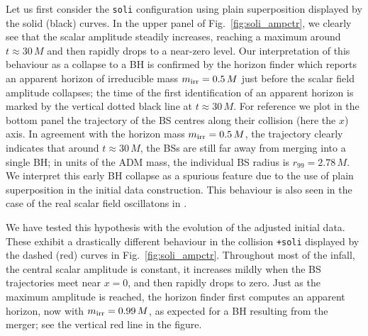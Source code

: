 \documentclass[]{iopart}
\begin{document}
%
Let us first consider the {\tt soli} configuration using plain
superposition displayed by the solid (black) curves. In the upper
panel of Fig.~\ref{fig:soli_ampctr}, we clearly see that the scalar
amplitude steadily increases, reaching a maximum around $t\approx
30\,M$ and then rapidly drops to a near-zero level.  Our interpretation
of this behaviour as a collapse to a BH is confirmed by the horizon
finder which reports an apparent horizon of irreducible mass $m_{\rm
irr}=0.5\,M$ just before the scalar field amplitude collapses; the
time of the first identification of an apparent horizon is marked
by the vertical dotted black line at $t\approx 30\,M$.  For reference
we plot in the bottom panel the trajectory of the BS centres along
their collision (here the $x$) axis. In agreement with the horizon
mass $m_{\rm irr}=0.5\,M$, the trajectory clearly indicates that
around $t\approx 30\,M$, the BSs are still far away from merging
into a single BH; in units of the ADM mass, the individual BS radius
is $r_{99}=2.78\,M$. We interpret this early BH collapse as a
spurious feature due to the use of plain superposition in the initial
data construction.  This behaviour is also seen in the case of the
real scalar field oscillatons in \cite{Helfer:2018vtq}.

We have tested this hypothesis with the evolution of the adjusted
initial data.  These exhibit a drastically different behaviour in
the collision {\tt +soli} displayed by the dashed (red) curves in
Fig.~\ref{fig:soli_ampctr}.  Throughout most of the infall, the
central scalar amplitude is constant, it increases mildly when the
BS trajectories meet near $x=0$, and then rapidly drops to zero.
Just as the maximum amplitude is reached, the horizon finder first
computes an apparent horizon, now with $m_{\rm irr}=0.99\,M$, as
expected for a BH resulting from the merger; see the vertical red
line in the figure.
\end{document}

